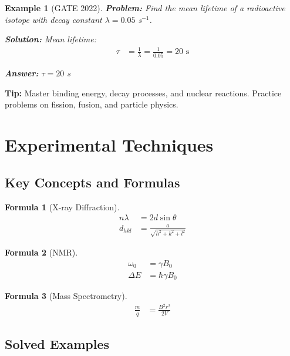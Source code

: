\documentclass[12pt,a4paper]{article}
\newtheorem{example}{Example}[section]
\newtheorem{formula}{Formula}[section]
\newcommand{\ans}[1]{\textcolor{red!70!black}{\textbf{Answer:} #1}}
\newcommand{\sol}{\textcolor{blue!70!black}{\textbf{Solution:}}}
\newcommand{\tip}[1]{\textcolor{green!60!black}{\textbf{Tip:} #1}}
\begin{document}
\begin{example}[GATE 2022]
\textbf{Problem:} Find the mean lifetime of a radioactive isotope with decay constant $\lambda = 0.05$ s$^{-1}$.

\sol
Mean lifetime:
\begin{align}
\tau &= \frac{1}{\lambda} = \frac{1}{0.05} = 20 \text{ s}
\end{align}

\ans{$\tau = 20$ s}
\end{example}

\tip{Master binding energy, decay processes, and nuclear reactions. Practice problems on fission, fusion, and particle physics.}

\section{Experimental Techniques}

\subsection{Key Concepts and Formulas}

\begin{formula}[X-ray Diffraction]
\begin{align}
n\lambda &= 2d\sin\theta\\
d_{hkl} &= \frac{a}{\sqrt{h^2 + k^2 + l^2}}
\end{align}
\end{formula}

\begin{formula}[NMR]
\begin{align}
\omega_0 &= \gamma B_0\\
\Delta E &= \hbar\gamma B_0
\end{align}
\end{formula}

\begin{formula}[Mass Spectrometry]
\begin{align}
\frac{m}{q} &= \frac{B^2 r^2}{2V}
\end{align}
\end{formula}

\subsection{Solved Examples}
\end{document}
